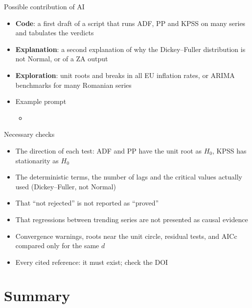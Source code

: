 \begin{frame}{Possible contribution of AI}
\itemsize{\small}
\begin{itemize}
    \item \textbf{Code}: a first draft of a script that runs ADF, PP and KPSS on many series and tabulates the verdicts
    \item \textbf{Explanation}: a second explanation of why the Dickey--Fuller distribution is not Normal, or of a ZA output
    \item \textbf{Exploration}: unit roots and breaks in all EU inflation rates, or ARIMA benchmarks for many Romanian series
    \item Example prompt
    \begin{itemize}
        \item {}
    \end{itemize}
\end{itemize}
\end{frame}

\begin{frame}{Necessary checks}
\itemsize{\small}
\begin{itemize}
    \item The direction of each test: ADF and PP have the unit root as $H_0$, KPSS has stationarity as $H_0$
    \item The deterministic terms, the number of lags and the critical values actually used (Dickey--Fuller, not Normal)
    \item That ``not rejected'' is not reported as ``proved''
    \item That regressions between trending series are not presented as causal evidence
    \item Convergence warnings, roots near the unit circle, residual tests, and AICc compared only for the same $d$
    \item Every cited reference: it must exist; check the DOI
\end{itemize}
\end{frame}


\section{Summary}

